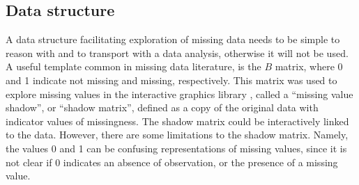 \documentclass[article]{jss}
\begin{document}
\hypertarget{data-structure}{%
\subsection{Data structure}\label{data-structure}}

A data structure facilitating exploration of missing data needs to be simple
to reason with and to transport with a data analysis, otherwise it will not
be used.  A useful template common in missing data literature, is the \(B\)
matrix, where 0 and 1 indicate not missing and missing, respectively.  This
matrix was used to explore missing values in the interactive graphics
library , called a ``missing value shadow'', or ``shadow
matrix'', defined as a copy of the original data with indicator values of
missingness.  The shadow matrix could be interactively linked to the data.
However, there are some limitations to the shadow matrix.  Namely, the
values 0 and 1 can be confusing representations of missing values, since it
is not clear if 0 indicates an absence of observation, or the presence of a
missing value.
\end{document}
